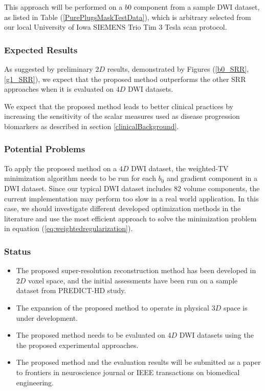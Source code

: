This approach will be performed on a $b0$ component from a sample DWI dataset, as listed in Table (\ref{PurePlugsMaskTestData}), which is arbitrary selected from our local University of Iowa SIEMENS Trio Tim $3$ Tesla scan protocol.
\newline

\subsubsection{Expected Results}

As suggested by preliminary $2D$ results, demonstrated by Figures (\ref{b0_SRR}, \ref{g1_SRR}), we expect that the proposed method outperforms the other SRR approaches when it is evaluated on $4D$ DWI datasets.

We expect that the proposed method leads to better clinical practices by increasing the sensitivity of the scalar measures used as disease progression biomarkers as described in section \ref{clinicalBackground}.
\newline

\subsubsection{Potential Problems}

To apply the proposed method on a $4D$ DWI dataset, the weighted-TV minimization algorithm needs to be run for each $b_0$ and gradient component in a DWI dataset. Since our typical DWI dataset includes $82$ volume components, the current implementation may perform too slow in a real world application. In this case, we should investigate different developed optimization methods in the literature \cite{marquina2008, zhu2008, chambolle2011} and use the most efficient approach to solve the minimization problem in equation (\ref{eq:weightedregularization}).
\newline

\subsubsection{Status}
\begin{itemize}
    \item The proposed super-resolution reconstruction method has been developed in $2D$ voxel space, and the initial assessments have been run on a sample dataset from PREDICT-HD study.
    \item The expansion of the proposed method to operate in physical $3D$ space is under development.
    \item The proposed method needs to be evaluated on $4D$ DWI datasets using the the proposed experimental approaches.
    \item The proposed method and the evaluation results will be submitted as a paper to frontiers in neuroscience journal or IEEE transactions on biomedical engineering.
\end{itemize}









\clearpage